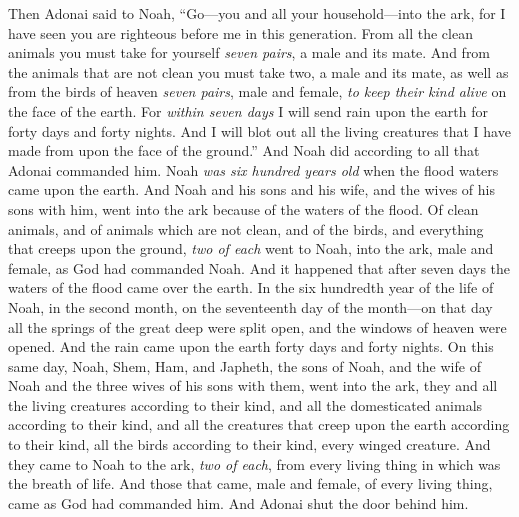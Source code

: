 \begin{biblechapter} %
\verse Then Adonai said to Noah, “Go—you and all your household—into the ark, for I have seen you are righteous before me in this generation.
\verse From all the clean animals you must take for yourself \textit{seven pairs}, a male and its mate. And from the animals that are not clean you must take two, a male and its mate,
\verse as well as from the birds of heaven \textit{seven pairs}, male and female, \textit{to keep their kind alive} on the face of the earth.
\verse For \textit{within seven days} I will send rain upon the earth for forty days and forty nights. And I will blot out all the living creatures that I have made from upon the face of the ground.”
\verse And Noah did according to all that Adonai commanded him.
 Noah \textit{was six hundred years old} when the flood waters came upon the earth.
\verse And Noah and his sons and his wife, and the wives of his sons with him, went into the ark because of the waters of the flood.
\verse Of clean animals, and of animals which are not clean, and of the birds, and everything that creeps upon the ground,
\verse \textit{two of each} went to Noah, into the ark, male and female, as God had commanded Noah.
\verse And it happened that after seven days the waters of the flood came over the earth.
\verse In the six hundredth year of the life of Noah, in the second month, on the seventeenth day of the month—on that day all the springs of the great deep were split open, and the windows of heaven were opened.
\verse And the rain came upon the earth forty days and forty nights.
\verse On this same day, Noah, Shem, Ham, and Japheth, the sons of Noah, and the wife of Noah and the three wives of his sons with them, went into the ark,
\verse they and all the living creatures according to their kind, and all the domesticated animals according to their kind, and all the creatures that creep upon the earth according to their kind, all the birds according to their kind, every winged creature.
\verse And they came to Noah to the ark, \textit{two of each}, from every living thing in which was the breath of life.
\verse And those that came, male and female, of every living thing, came as God had commanded him. And Adonai shut the door behind him.

\end{biblechapter}

